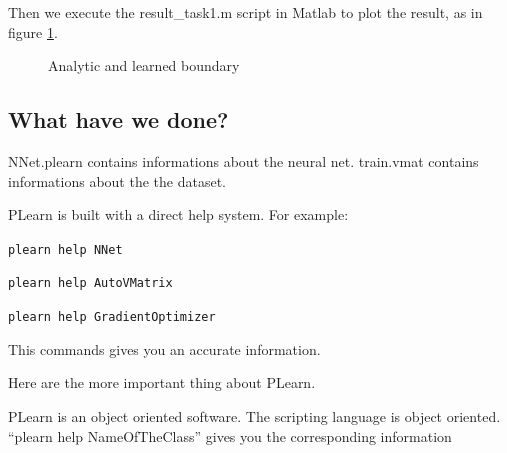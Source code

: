 Then we execute the result\_task1.m script in Matlab to plot the result, as in figure 
\ref{df}.\begin{figure}
  \caption{Analytic and learned boundary}  
\label{df}
\end{figure}

\subsection{What have we done?}

NNet.plearn contains informations about the neural net. train.vmat contains informations about the the dataset.

PLearn is built with a direct help system. For example:

\texttt{plearn help NNet}

\texttt{plearn help AutoVMatrix}

\texttt{plearn help GradientOptimizer}

This commands gives you an accurate information.

Here are the more important thing about PLearn.

\begin{bf}PLearn is an object oriented software. The scripting language is object 
oriented. ``plearn help NameOfTheClass'' gives you the corresponding information
\end{bf}

